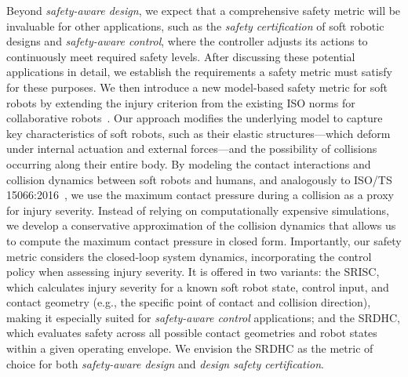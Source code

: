 Beyond \emph{safety-aware design}, we expect that a comprehensive safety metric will be invaluable for other applications, such as the \emph{safety certification} of soft robotic designs and \emph{safety-aware control}, where the controller adjusts its actions to continuously meet required safety levels. After discussing these potential applications in detail, we establish the requirements a safety metric must satisfy for these purposes. We then introduce a new model-based safety metric for soft robots by extending the injury criterion from the existing ISO norms for collaborative robots~\citep{Isots_15066_2016}. Our approach modifies the underlying model to capture key characteristics of soft robots, such as their elastic structures—which deform under internal actuation and external forces—and the possibility of collisions occurring along their entire body. By modeling the contact interactions and collision dynamics between soft robots and humans, and analogously to ISO/TS 15066:2016~\citep{Isots_15066_2016}, we use the maximum contact pressure during a collision as a proxy for injury severity. Instead of relying on computationally expensive simulations, we develop a conservative approximation of the collision dynamics that allows us to compute the maximum contact pressure in closed form. Importantly, our safety metric considers the closed-loop system dynamics, incorporating the control policy when assessing injury severity. It is offered in two variants: the \gls{SRISC}, which calculates injury severity for a known soft robot state, control input, and contact geometry (e.g., the specific point of contact and collision direction), making it especially suited for \emph{safety-aware control} applications; and the \gls{SRDHC}, which evaluates safety across all possible contact geometries and robot states within a given operating envelope. We envision the \gls{SRDHC} as the metric of choice for both \emph{safety-aware design} and \emph{design safety certification}.